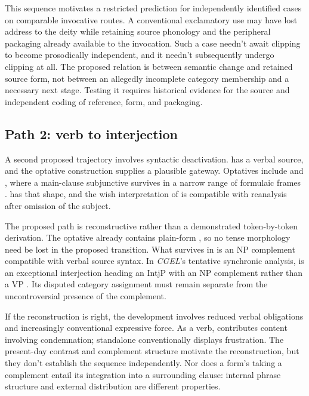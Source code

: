 \documentclass[12pt]{article}
\begin{document}
This sequence motivates a restricted prediction for independently identified cases on comparable invocative routes. A conventional exclamatory use may have lost address to the deity while retaining source phonology and the peripheral packaging already available to the invocation. Such a case needn't await clipping to become prosodically independent, and it needn't subsequently undergo clipping at all. The proposed relation is between semantic change and retained source form, not between an allegedly incomplete category membership and a necessary next stage. Testing it requires historical evidence for the source and independent coding of reference, form, and packaging.

\subsection{Path 2: verb to interjection}

A second proposed trajectory involves syntactic deactivation.  has a verbal source, and the optative construction supplies a plausible gateway. Optatives include  and , where a main-clause subjunctive survives in a narrow range of formulaic frames \citep[944]{HuddlestonPullum2002}.  has that shape, and the wish interpretation of  is compatible with reanalysis after omission of the subject.

The proposed path is reconstructive rather than a demonstrated token-by-token derivation. The optative already contains plain-form , so no tense morphology need be lost in the proposed transition. What survives in  is an NP complement compatible with verbal source syntax. In \textit{CGEL}'s tentative synchronic analysis,  is an exceptional interjection heading an IntjP with an NP complement rather than a VP \citep[1361 n.~70]{HuddlestonPullum2002}. Its disputed category assignment must remain separate from the uncontroversial presence of the complement.

If the reconstruction is right, the development involves reduced verbal obligations and increasingly conventional expressive force. As a verb,  contributes content involving condemnation; standalone  conventionally displays frustration. The present-day contrast and complement structure motivate the reconstruction, but they don't establish the sequence independently. Nor does a form's taking a complement entail its integration into a surrounding clause: internal phrase structure and external distribution are different properties.
\end{document}
